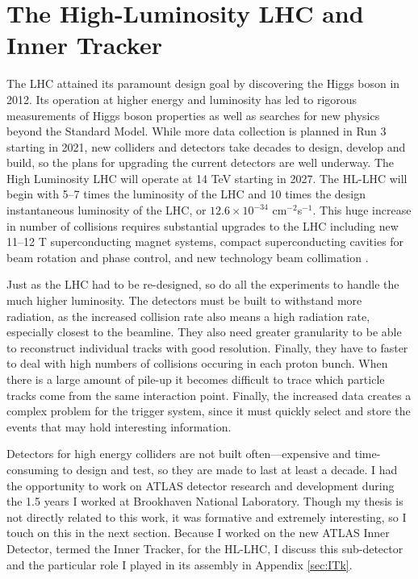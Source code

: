 \section{The High-Luminosity LHC and Inner Tracker}
The LHC attained its paramount design goal by discovering the Higgs boson in 2012. Its operation at higher energy and luminosity has led to rigorous measurements of Higgs boson properties as well as searches for new physics beyond the Standard Model. While more data collection is planned in Run 3 starting in 2021, new colliders and detectors take decades to design, develop and build, so the plans for upgrading the current detectors are well underway. The High Luminosity LHC will operate at 14 TeV starting in 2027. The HL-LHC will begin with 5--7 times the luminosity of the LHC and 10 times the design instantaneous luminosity of the LHC, or $12.6\times10^{-34}$ cm$^{-2}$s$^{-1}$. This huge increase in number of collisions requires substantial upgrades to the LHC including new 11--12 T superconducting magnet systems, compact superconducting cavities for beam rotation and phase control, and new technology beam collimation \cite{HLLHCYellow}. 

Just as the LHC had to be re-designed, so do all the experiments to handle the much higher luminosity. The detectors must be built to withstand more radiation, as the increased collision rate also means a high radiation rate, especially closest to the beamline. They also need greater granularity to be able to reconstruct individual tracks with good resolution. Finally, they have to faster to deal with high numbers of collisions occuring in each proton bunch. When there is a large amount of pile-up it becomes difficult to trace which particle tracks come from the same interaction point. Finally, the increased data creates a complex problem for the trigger system, since it must quickly select and store the events that may hold interesting information. 

Detectors for high energy colliders are not built often---expensive and time-consuming to design and test, so they are made to last at least a decade. I had the opportunity to work on ATLAS detector research and development during the 1.5 years I worked at Brookhaven National Laboratory. Though my thesis is not directly related to this work, it was formative and extremely interesting, so I touch on this in the next section. Because I worked on the new ATLAS Inner Detector, termed the Inner Tracker, for the HL-LHC, I discuss this sub-detector and the particular role I played in its assembly in Appendix \ref{sec:ITk}.

